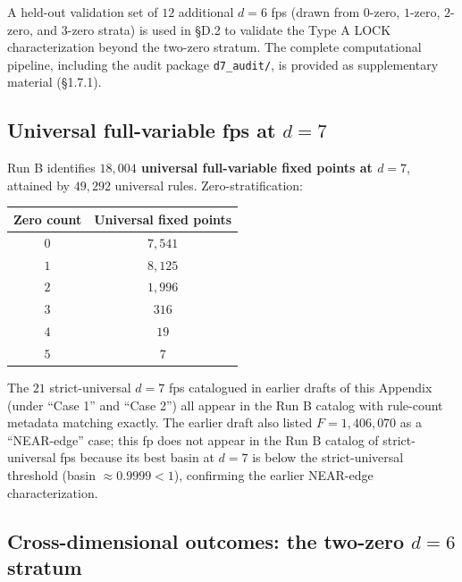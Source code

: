 \documentclass[11pt,letterpaper]{article}
\theoremstyle{paperstyle}
\theoremstyle{paperstyledef}
\theoremstyle{paperstylerem}
\begin{document}
A held-out validation set of \(12\) additional \(d = 6\) fps (drawn from
\(0\)-zero, \(1\)-zero, \(2\)-zero, and \(3\)-zero strata) is used in
§D.2 to validate the Type A LOCK characterization beyond the two-zero
stratum. The complete computational pipeline, including the audit
package \texttt{d7\_audit/}, is provided as supplementary material
(§1.7.1).

\hypertarget{d.1-universal-full-variable-fps-at-d-7}{%
\subsection{\texorpdfstring{Universal full-variable fps at \(d = 7\)}{Universal full-variable fps at d = 7}}\label{d.1-universal-full-variable-fps-at-d-7}}

Run B identifies \textbf{\(18{,}004\) universal full-variable fixed
points at \(d = 7\)}, attained by \(49{,}292\) universal rules.
Zero-stratification:

\begin{longtable}[]{@{}cc@{}}
\toprule\noalign{}
Zero count & Universal fixed points \\
\midrule\noalign{}
\endhead
\bottomrule\noalign{}
\endlastfoot
\(0\) & \(7{,}541\) \\
\(1\) & \(8{,}125\) \\
\(2\) & \(1{,}996\) \\
\(3\) & \(316\) \\
\(4\) & \(19\) \\
\(5\) & \(7\) \\
\end{longtable}

The \(21\) strict-universal \(d = 7\) fps catalogued in earlier drafts
of this Appendix (under ``Case 1'' and ``Case 2'') all appear in the Run
B catalog with rule-count metadata matching exactly. The earlier draft
also listed \(F = 1{,}406{,}070\) as a ``NEAR-edge'' case; this fp does
not appear in the Run B catalog of strict-universal fps because its best
basin at \(d = 7\) is below the strict-universal threshold (basin
\(\approx 0.9999 < 1\)), confirming the earlier NEAR-edge
characterization.

\hypertarget{d.2-cross-dimensional-outcomes-the-two-zero-d-6-stratum}{%
\subsection{\texorpdfstring{Cross-dimensional outcomes: the two-zero \(d = 6\) stratum}{Cross-dimensional outcomes: the two-zero d = 6 stratum}}\label{d.2-cross-dimensional-outcomes-the-two-zero-d-6-stratum}}
\end{document}
